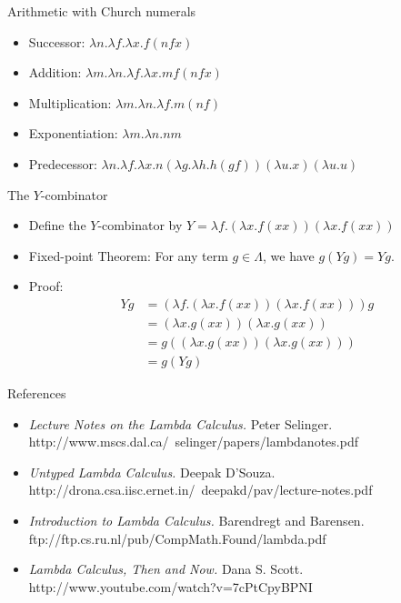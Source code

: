 \documentclass{beamer}
\begin{document}
\begin{frame}{Arithmetic with Church numerals}
\begin{itemize}
\item Successor: $\lambda n.\lambda f.\lambda x. f (n f x)$
\item Addition: $\lambda m.\lambda n.\lambda f.\lambda x. m f (n f x)$
\item Multiplication: $\lambda m.\lambda n.\lambda f. m (n f)$
\item Exponentiation: $\lambda m.\lambda n. n m$
\item Predecessor: $\lambda n.\lambda f.\lambda x. n (\lambda g.\lambda h. h (g f)) (\lambda u. x) (\lambda u. u)$
\end{itemize}
\end{frame}

\begin{frame}{The $Y$-combinator}
\begin{itemize}
\item Define the $Y$-combinator by $Y = \lambda f.(\lambda x.f (x x)) (\lambda x.f (x x))$
\item Fixed-point Theorem: For any term $g \in \Lambda$, we have $g(Yg) = Yg$. 
\item Proof: 
\begin{align*}
Y g	& = (\lambda f . (\lambda x . f (x x)) (\lambda x . f (x x))) g
\\ & = (\lambda x . g (x x)) (\lambda x . g (x x))	
\\ & = g ((\lambda x . g (x x)) (\lambda x . g (x x)))	
\\ & = g (Y g)
\end{align*}
\end{itemize}
\end{frame}


\begin{frame}{References}
\begin{itemize}
\item \emph{Lecture Notes on the Lambda Calculus.} Peter Selinger.
http://www.mscs.dal.ca/~selinger/papers/lambdanotes.pdf
\item \emph{Untyped Lambda Calculus.} Deepak D'Souza. http://drona.csa.iisc.ernet.in/~deepakd/pav/lecture-notes.pdf
\item \emph{Introduction to Lambda Calculus.} Barendregt and Barensen.
ftp://ftp.cs.ru.nl/pub/CompMath.Found/lambda.pdf
\item \emph{Lambda Calculus, Then and Now.} Dana S. Scott. http://www.youtube.com/watch?v=7cPtCpyBPNI
\end{itemize}
\end{frame}
\end{document}
